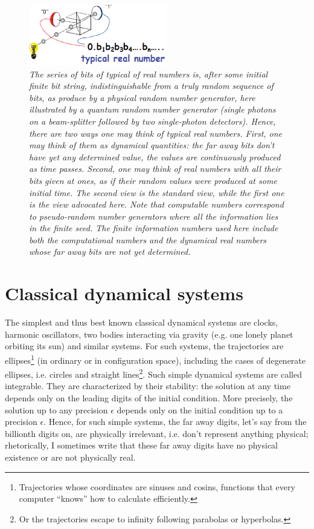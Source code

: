 \documentclass[floatfix,12pt]{article}
\begin{document}
\begin{figure}[t]
\begin{center}\includegraphics[width=6cm]{TypicalRealNumber.eps}\end{center}
\caption{\it The series of bits of typical of real numbers is, after some initial finite bit string, indistinguishable from a truly random sequence of bits, as produce by a physical random number generator, here illustrated by a quantum random number generator (single photons on a beam-splitter followed by two single-photon detectors). Hence, there are two ways one may think of typical real numbers. First, one may think of them as dynamical quantities: the far away bits don't have yet any determined value, the values are continuously produced as time passes. Second, one may think of real numbers with all their bits given at ones, as if their random values were produced at some initial time. The second view is the standard view, while the first one is the view advocated here. Note that computable numbers correspond to pseudo-random number generators where all the information lies in the finite seed. The finite information numbers used here include both the computational numbers and the dynamical real numbers whose far away bits are not yet determined.}
\label{figure}
\end{figure} 


\section{Classical dynamical systems}\label{cds}
The simplest and thus best known classical dynamical systems are clocks, harmonic oscillators, two bodies interacting via gravity (e.g. one lonely planet orbiting its sun) and similar systems. For such systems, the trajectories are ellipses\footnote{Trajectories whose coordinates are sinuses and cosins, functions that every computer ``knows'' how to calculate efficiently.} (in ordinary or in configuration space), including the cases of degenerate ellipses, i.e. circles and straight lines\footnote{Or the trajectories escape to infinity following parabolas or hyperbolas.}. Such simple dynamical systems are called integrable. They are characterized by their stability: the solution at any time depends only on the leading digits of the initial condition. More precisely, the solution up to any precision $\epsilon$ depends only on the initial condition up to a precision $\epsilon$. Hence, for such simple systems, the far away digits, let's say from the billionth digits on, are physically irrelevant, i.e. don't represent anything physical; rhetorically, I sometimes write that these far away digits have no physical existence or are not physically real. 
\end{document}
